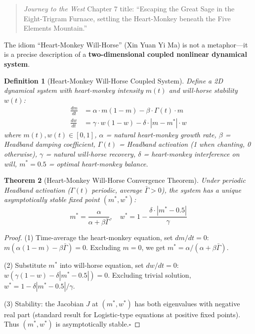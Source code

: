 \documentclass[conference]{IEEEtran}
\newtheorem{theorem}{Theorem}[section]
\newtheorem{definition}[theorem]{Definition}
\theoremstyle{remark}
\begin{document}
\begin{quote}
\emph{Journey to the West} Chapter 7 title: ``Escaping the Great Sage in the Eight-Trigram Furnace, settling the Heart-Monkey beneath the Five Elements Mountain.''
\end{quote}

The idiom ``Heart-Monkey Will-Horse'' (Xin Yuan Yi Ma) is not a metaphor---it is a precise description of a \textbf{two-dimensional coupled nonlinear dynamical system}.

\begin{definition}[Heart-Monkey Will-Horse Coupled System]
Define a 2D dynamical system with heart-monkey intensity $m(t)$ and will-horse stability $w(t)$:
\begin{align*}
\frac{dm}{dt} &= \alpha \cdot m(1-m) - \beta \cdot \Gamma(t) \cdot m\\
\frac{dw}{dt} &= \gamma \cdot w(1-w) - \delta \cdot |m - m^*| \cdot w
\end{align*}
where $m(t),w(t)\in[0,1]$, $\alpha$ = natural heart-monkey growth rate, $\beta$ = Headband damping coefficient, $\Gamma(t)$ = Headband activation (1 when chanting, 0 otherwise), $\gamma$ = natural will-horse recovery, $\delta$ = heart-monkey interference on will, $m^*=0.5$ = optimal heart-monkey balance.
\end{definition}

\begin{theorem}[Heart-Monkey Will-Horse Convergence Theorem]
Under periodic Headband activation ($\Gamma(t)$ periodic, average $\bar{\Gamma}>0$), the system has a unique asymptotically stable fixed point $(m^*, w^*)$:
\[
m^* = \frac{\alpha}{\alpha + \beta\bar{\Gamma}},\quad w^* = 1 - \frac{\delta\cdot|m^*-0.5|}{\gamma}
\]
\end{theorem}
\begin{proof}
(1) Time-average the heart-monkey equation, set $dm/dt=0$: $m(\alpha(1-m)-\beta\bar{\Gamma})=0$. Excluding $m=0$, we get $m^* = \alpha/(\alpha+\beta\bar{\Gamma})$.

(2) Substitute $m^*$ into will-horse equation, set $dw/dt=0$: $w(\gamma(1-w)-\delta|m^*-0.5|)=0$. Excluding trivial solution, $w^* = 1 - \delta|m^*-0.5|/\gamma$.

(3) Stability: the Jacobian $J$ at $(m^*,w^*)$ has both eigenvalues with negative real part (standard result for Logistic-type equations at positive fixed points). Thus $(m^*,w^*)$ is asymptotically stable.\hfill$\square$
\end{proof}
\end{document}
